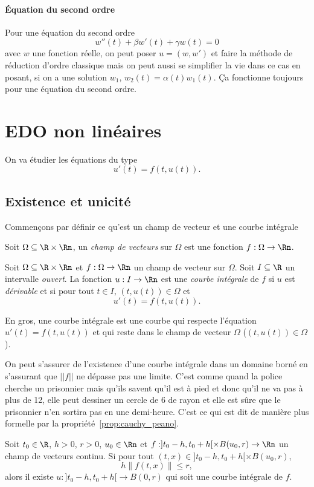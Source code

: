 \paragraph{Équation du second ordre}
Pour une équation du second ordre
\[ w''(t) + \beta w'(t) + \gamma w(t) = 0 \]
avec $w$ une fonction réelle,
on peut poser $u = (w,w')$ et faire la méthode de réduction d'ordre
classique mais on peut aussi se simplifier la vie dans ce cas en posant,
si on a une solution $w_1$,
$w_2(t) = \alpha(t) w_1(t)$.
Ça fonctionne toujours pour une équation du second ordre.

\section{EDO non linéaires}
On va étudier les équations du type
\[ u'(t) = f(t, u(t)). \]

\subsection{Existence et unicité}
Commençons par définir ce qu'est un champ de vecteur et
une courbe intégrale
\begin{mydef}
  Soit $\Omega \subseteq \R \times \Rn$,
  un \emph{champ de vecteurs} sur $\Omega$ est une fonction
  $f:\Omega \to \Rn$.
\end{mydef}
\begin{mydef}
  Soit $\Omega \subseteq \R \times \Rn$ et $f:\Omega\to\Rn$
  un champ de vecteur sur $\Omega$.
  Soit $I \subseteq \R$ un intervalle \emph{ouvert}.
  La fonction $u:I\to\Rn$ est une \emph{courbe intégrale} de $f$ si $u$
  est \emph{dérivable} et si pour tout $t\in I$, $(t, u(t)) \in \Omega$ et
  \[ u'(t) = f(t, u(t)). \]
\end{mydef}
En gros, une courbe intégrale est une courbe qui respecte l'équation
$u'(t) = f(t, u(t))$ et qui reste dans le champ de vecteur $\Omega$
($(t, u(t)) \in \Omega$).

On peut s'assurer de l'existence d'une courbe intégrale dans un domaine
borné en s'assurant que $||f||$ ne dépasse pas une limite.
C'est comme quand la police cherche un prisonnier mais qu'ils savent
qu'il est à pied et donc qu'il ne va pas à plus de
\si{12}{\kilo\meter\per\hour}, elle peut dessiner un cercle de
\si{6}{\kilo\meter} de rayon
et elle est sûre que le prisonnier n'en sortira pas en
une demi-heure.
C'est ce qui est dit de manière plus formelle par
la propriété~\ref{prop:cauchy_peano}.
\begin{myprop}
  \label{prop:cauchy_peano}
  Soit $t_0 \in \R$, $h > 0$, $r > 0$,
  $u_0 \in \Rn$ et $f:]t_0-h,t_0+h[\times B(u_0,r)\to\Rn$ un champ de vecteurs
  continu.
  Si pour tout $(t,x) \in ]t_0-h,t_0+h[ \times B(u_0,r)$,
  \[ h\|f(t,x)\| \leq r, \]
  alors il existe $u:]t_0-h,t_0+h[ \to B(0,r)$
  qui soit une courbe intégrale de $f$.
\end{myprop}

